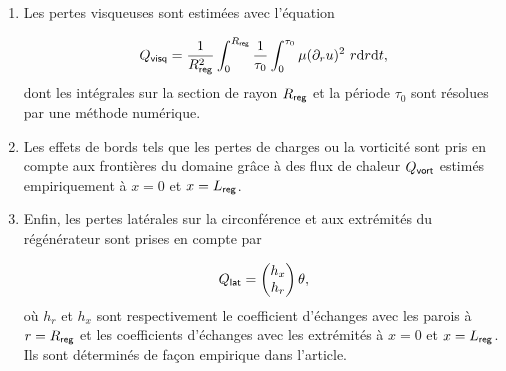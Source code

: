\begin{enumerate}[label=\textbf{(\roman*)}]
\item Les pertes visqueuses sont estimées avec l'équation

\begin{equation}
Q_{\sf visq} = \frac{1}{R_{\sf reg}^2} \int_{0}^{R_{\sf reg}} \frac{1}{\tau_0} \int_0^{\tau_0} \mu (\partial_r u)^2\ r \mathrm{d} r \mathrm{d} t,
\label{eq:FluxVisq_Lotton}
\end{equation}
dont les intégrales sur la section de rayon $R_{\sf reg}$ et la période $\tau_0$ sont résolues par une méthode numérique.

\item Les effets de bords tels que les pertes de charges ou la vorticité sont pris en compte aux frontières du domaine grâce à des flux de chaleur $Q_{\sf vort}$ estimés empiriquement à $x=0$ et $x=L_{\sf reg}$.

\item Enfin, les pertes latérales sur la circonférence et aux extrémités du régénérateur sont prises en compte par

\begin{equation}
Q_{\sf lat} = \begin{pmatrix}h_x\\h_r\end{pmatrix} \theta,
\label{eq:FluxLat_Lotton}
\end{equation}
où $h_r$ et $h_x$ sont respectivement le coefficient d'échanges avec les parois à $r = R_{\sf reg}$ et les coefficients d'échanges avec les extrémités à $x=0$ et $x=L_{\sf reg}$. Ils sont déterminés de façon empirique dans l'article.

%
%

\end{enumerate} 

